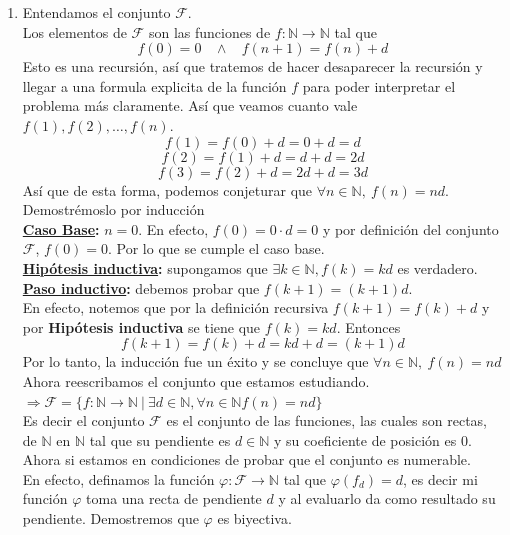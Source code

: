 \documentclass[letterpaper,12pt]{article}
\newcommand{\N}{\mathbb N}
\theoremstyle{plain}
\begin{document}
\begin{enumerate}[a)]
\begin{enumerate}[\bf P1.]
        \item Entendamos el conjunto $\mathcal{F}$.\\
        Los elementos de $\mathcal{F}$ son las funciones de $f:\N \to  \N$ tal que 
        $$f(0)=0 ~~~~\land~~~~ f(n+1)=f(n)+d  $$
        Esto es una recursión, así que tratemos de hacer desaparecer la recursión y llegar a una formula explicita de la función $f$ para poder interpretar el problema más claramente. Así que veamos cuanto vale $f(1), f(2),\dots,f(n)$.
        $$f(1)=f(0)+d=0+d=d $$
        $$ f(2)=f(1)+d=d+d=2d $$
        $$ f(3)=f(2)+d=2d +d =3d$$
        Así que de esta forma, podemos conjeturar que $\forall n\in \N,~f(n)=nd$. Demostrémoslo por inducción\\
        
        \textbf{\underline{Caso Base}:} $n=0$. En efecto, $f(0)=0\cdot d=0$ y por definición del conjunto $\mathcal{F}$, $f(0)=0$. Por lo que se cumple el caso base.\\
        
        \textbf{\underline{Hipótesis inductiva}:} supongamos que $\exists k\in \N, f(k)=kd$ es verdadero.\\
         
        \textbf{\underline{Paso inductivo}:} debemos probar que $f(k+1)=(k+1)d$.\\
        En efecto, notemos que por la definición recursiva $f(k+1)=f(k)+d$ y por \textbf{Hipótesis inductiva} se tiene que $f(k)=kd$. Entonces 
            $$ f(k+1)=f(k)+d=kd +d=(k+1)d $$
        Por lo tanto, la inducción fue un éxito y se concluye que $\forall n\in \N,~f(n)=nd$\\
        
        Ahora reescribamos el conjunto que estamos estudiando.\\
        $\Longrightarrow \mathcal{F}=\{f:\N\to \N ~|~ \exists d\in \N, \forall n\in \N f(n)=nd \}$\\
        Es decir el conjunto $\mathcal{F}$ es el conjunto de las funciones, las cuales son rectas, de $\N$ en $\N$ tal que su pendiente es $d\in \N$ y su coeficiente de posición es $0$. Ahora si estamos en condiciones de probar que el conjunto es numerable.\\
        
        En efecto, definamos la función $\varphi: \mathcal{F} \to \N$ tal que $\varphi(f_d)=d$, es decir mi función $\varphi$ toma una recta de pendiente $d$ y al evaluarlo da como resultado su pendiente. Demostremos que $\varphi$ es biyectiva.\\
        

\end{enumerate}
\end{enumerate}
\end{document}
